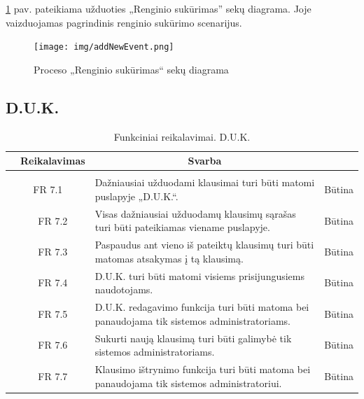 \documentclass{VUMIFPSkursinis}
\begin{document}
\ref{fig:addevent} pav. pateikiama užduoties „Renginio sukūrimas” sekų diagrama. Joje vaizduojamas pagrindinis
renginio sukūrimo scenarijus.
\begin{figure}[H]
	\centering
	\texttt{[image: img/addNewEvent.png]}
	\caption{Proceso „Renginio sukūrimas“ sekų diagrama}
	\label{fig:addevent}
\end{figure}

\subsection{D.U.K.}
	\begin{table}[H]
	\caption{Funkciniai reikalavimai. D.U.K.}
	\begin{tabular}{|p{1cm}|p{1cm}|p{}|p{}|}
		\hline 
		\rowcolor{gray!50}
		\multicolumn{2}{|c|}{{\bfseries Kodas}}&
		\multicolumn{1}{c|}{{\bfseries Reikalavimas}}&
		\multicolumn{1}{c|}{{\bfseries Svarba}}\\
		\hline
		\rowcolor{lightgray}
		\multicolumn{4}{|c|}{D.U.K.}\\		
		
		\hline
		\multicolumn{2}{|c|}{FR 7.1}&
		{Dažniausiai užduodami klausimai turi būti matomi puslapyje „D.U.K.“.
		}&		
		\multicolumn{1}{c|}{Būtina}\\
		\hline
		\multicolumn{1}{|c}{}&
		\multicolumn{1}{c|}{FR 7.2}&
		{Visas dažniausiai užduodamų klausimų sąrašas turi būti pateikiamas viename puslapyje.
		}&		
		\multicolumn{1}{c|}{Būtina}\\
		\hline
		\multicolumn{1}{|c}{}&
		\multicolumn{1}{c|}{FR 7.3}&
		{Paspaudus ant vieno iš pateiktų klausimų turi būti matomas atsakymas į tą klausimą.
		}&
		\multicolumn{1}{c|}{Būtina}\\	
		\hline		
		\multicolumn{1}{|c}{}&
		\multicolumn{1}{c|}{FR 7.4}&
		{D.U.K. turi būti matomi visiems prisijungusiems naudotojams.
		}&
		\multicolumn{1}{c|}{Būtina}\\									
		\hline
		\multicolumn{1}{|c}{}&
		\multicolumn{1}{c|}{FR 7.5}&
		{D.U.K. redagavimo funkcija turi būti matoma bei panaudojama tik sistemos administratoriams.
		}&
		\multicolumn{1}{c|}{Būtina}\\	
		\hline	
		\multicolumn{1}{|c}{}&
		\multicolumn{1}{c|}{FR 7.6}&
		{Sukurti naują klausimą turi būti galimybė tik sistemos administratoriams.
		}&
		\multicolumn{1}{c|}{Būtina}\\	
		\hline	
		\multicolumn{1}{|c}{}&
		\multicolumn{1}{c|}{FR 7.7}&
		{Klausimo ištrynimo funkcija turi būti matoma bei panaudojama tik sistemos administratoriui.
		}&
		\multicolumn{1}{c|}{Būtina}\\	
		\hline	
	\end{tabular}		
\end{table}
\end{document}
